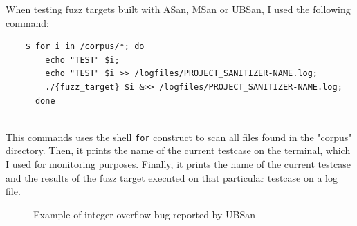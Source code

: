 \newpage
When testing fuzz targets built with ASan, MSan or UBSan, I used the following command:
\begin{verbatim}
    $ for i in /corpus/*; do 
        echo "TEST" $i; 
        echo "TEST" $i >> /logfiles/PROJECT_SANITIZER-NAME.log; 
        ./{fuzz_target} $i &>> /logfiles/PROJECT_SANITIZER-NAME.log; 
      done
\end{verbatim}
\ \\
This commands uses the shell \verb|for| construct to scan all files found in the "corpus" directory.
\newline
Then, it prints the name of the current testcase on the terminal, which I used for monitoring purposes.
\newline
Finally, it prints the name of the current testcase and the results of the fuzz target executed on that particular testcase on a log file.
\newline
\begin{figure}[h]
\caption{Example of integer-overflow bug reported by UBSan}
\label{fig:ubsan_example}
\end{figure}
\ \\



